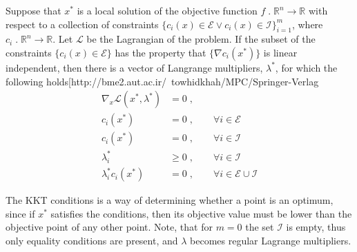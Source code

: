 \begin{theorem}
	Suppose that $x^*$ is a local solution of the objective function $f \; . \; \mathbb{R}^n \to \mathbb{R}$ with respect to a collection of constraints $\{ c_i(x) \in \mathcal{E} \vee c_i(x) \in \mathcal{I} \}_{i=1}^{m}$, where $c_i \; . \; \mathbb{R}^n \to \mathbb{R}$. Let $\mathcal{L}$ be the Lagrangian of the problem. If the subset of the constraints $\{ c_i(x) \in \mathcal{E}\}$ has the property that $\{ \nabla c_i(x^*)\}$ is linear independent, then there is a vector of Langrange multipliers, $\lambda^*$, for which the following holds[http://bme2.aut.ac.ir/~towhidkhah/MPC/Springer-Verlag%
	\begin{subequations}	
	\begin{align}
		\nabla_x \mathcal{L}(x^*,\lambda^*) &= 0 \; ,  \\
		c_i(x^*) &= 0 \; , \qquad \forall i \in \mathcal{E} \\
		c_i(x^*) &= 0 \; , \qquad \forall i \in \mathcal{I} \\
		\lambda_{i}^* &\geq 0 \; , \qquad \forall i \in \mathcal{I} \\
		\lambda_{i}^* c_i(x^*) &= 0 \; , \qquad \forall i \in \mathcal{E} \cup \mathcal{I}
	\end{align}
	\end{subequations}	  
\end{theorem}
The KKT conditions is a way of determining whether a point is an optimum, since if $x^*$ satisfies the conditions, then its objective value must be lower than the objective point of any other point.
Note, that for $m = 0$ the set $\mathcal{I}$ is empty, thus only equality conditions are present, and $\lambda$ becomes regular Lagrange multipliers. 

